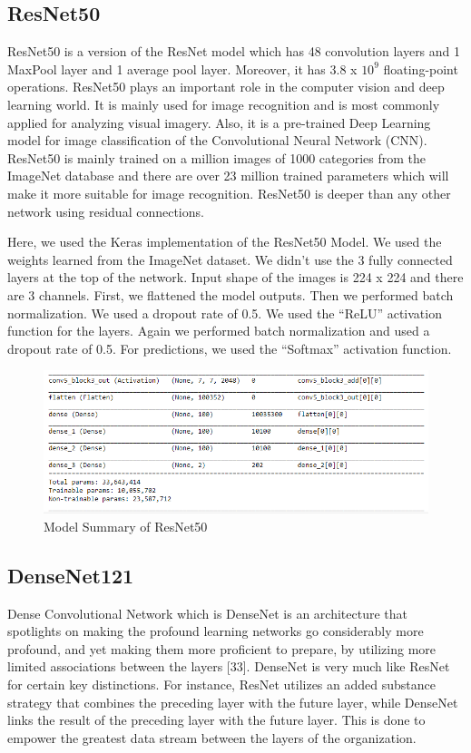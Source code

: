 \subsection{ResNet50}
ResNet50 is a version of the ResNet model which has 48 convolution layers and 1 MaxPool layer and 1 average pool layer. Moreover, it has 3.8 x \(10^9\) floating-point operations. ResNet50 plays an important role in the computer vision and deep learning world. It is mainly used for image recognition and is most commonly applied for analyzing visual imagery. Also, it is a pre-trained Deep Learning model for image classification of the Convolutional Neural Network (CNN). ResNet50 is mainly trained on a million images of 1000 categories from the ImageNet database and there are over 23 million trained parameters which will make it more suitable for image recognition. ResNet50 is deeper than any other network using residual connections.

\vspace{5mm}
\noindent Here, we used the Keras implementation of the ResNet50 Model. We used the weights learned from the ImageNet dataset. We didn’t use the 3 fully connected layers at the top of the network. Input shape of the images is 224 x 224 and there are 3 channels. First, we flattened the model outputs. Then we performed batch normalization. We used a dropout rate of 0.5. We used the “ReLU” activation function for the layers. Again we performed batch normalization and used a dropout rate of 0.5. For predictions, we used the “Softmax” activation function. 

\vspace{5mm}
\begin{figure}[hbt!]
\centering
\includegraphics[scale=0.75]{images/ResNet50.PNG}
\caption{Model Summary of ResNet50}
\label{fig:x Model Summary of ResNet50}
\end{figure}

\subsection{DenseNet121}
Dense Convolutional Network which is DenseNet is an architecture that spotlights on making the profound learning networks go considerably more profound, and yet making them more proficient to prepare, by utilizing more limited associations between the layers [33]. DenseNet is very much like ResNet for certain key distinctions. For instance, ResNet utilizes an added substance strategy that combines the preceding layer with the future layer, while DenseNet links the result of the preceding layer with the future layer. This is done to empower the greatest data stream between the layers of the organization.

